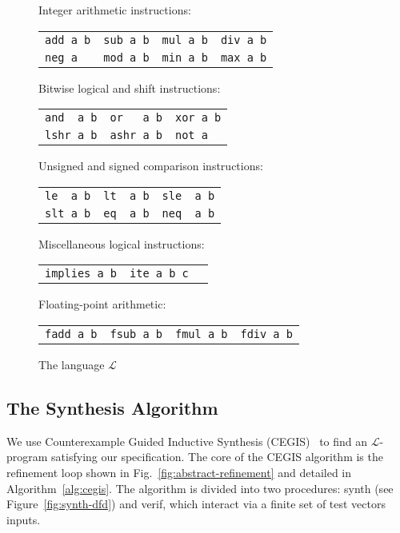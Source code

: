 \documentclass[preprint]{sigplanconf}
\theoremstyle{definition}
\begin{document}
\begin{figure}
{\small
\begin{center}
\setlength{\tabcolsep}{16pt}
Integer arithmetic instructions:

\begin{tabular}{llll}
 \verb|add a b| & \verb|sub a b| & \verb|mul a b| & \verb|div a b| \\
 \verb|neg a| &   \verb|mod a b| & \verb|min a b| & \verb|max a b|
\end{tabular}

\medskip

Bitwise logical and shift instructions:

\begin{tabular}{lll}
 \verb|and  a b| & \verb|or   a b| & \verb|xor a b| \\
 \verb|lshr a b| & \verb|ashr a b| & \verb|not a|
\end{tabular}

\medskip

Unsigned and signed comparison instructions:

\begin{tabular}{lll}
 \verb|le  a b| & \verb|lt  a b| & \verb|sle  a b| \\
 \verb|slt a b| & \verb|eq  a b| & \verb|neq  a b|
\end{tabular}

Miscellaneous logical instructions:

\begin{tabular}{lll}
 \verb|implies a b| & \verb|ite a b c| & 
\end{tabular}

Floating-point arithmetic:

\begin{tabular}{llll}
 \verb|fadd a b| & \verb|fsub a b| & \verb|fmul a b| & \verb|fdiv a b| 
\end{tabular}


\end{center}
}
 \caption{The language $\mathcal{L}$}
 \label{fig:l-language}
\end{figure}

\subsection{The Synthesis Algorithm}

We use Counterexample Guided Inductive Synthesis
(CEGIS)~\cite{lezama-thesis,sketch, DBLP:conf/iclp/BrainCVF06} to find an
$\mathcal{L}$-program satisfying our specification.  The core of the CEGIS
algorithm is the refinement loop shown in Fig.~\ref{fig:abstract-refinement}
and detailed in Algorithm~\ref{alg:cegis}.  The algorithm is divided into
two procedures: {\sc synth} (see Figure~\ref{fig:synth-dfd}) and {\sc
verif}, which interact via a finite set of test vectors {\sc inputs}.
\end{document}

